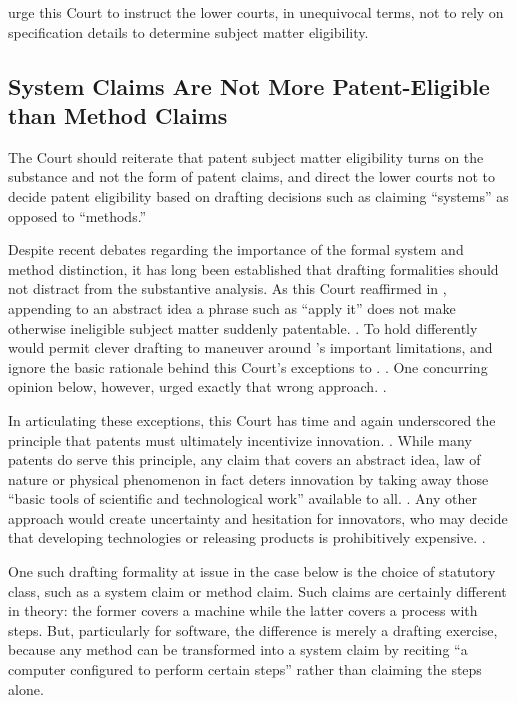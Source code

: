 \documentclass{scotus}
\begin{document}
\Amici urge this Court to instruct the lower courts, in unequivocal
terms, not to rely on specification details to determine subject matter
eligibility.



%
%
\subsection{System Claims Are Not More Patent-Eligible than Method Claims}

The Court should reiterate that patent subject matter eligibility turns on the
substance and not the form of patent claims, and direct
the lower courts not to decide patent eligibility based on drafting
decisions such as claiming “systems” as opposed to “methods.” 

Despite recent debates regarding the importance of the formal system and method
distinction, it has long been established that drafting formalities should not
distract from
the substantive  analysis.  As this Court reaffirmed in
, appending to an abstract idea
a phrase such as “apply it” does
not make otherwise ineligible subject matter suddenly patentable. .  To hold differently would permit clever drafting to maneuver around
's important limitations, and ignore the basic rationale behind this
Court's exceptions to . . One concurring
opinion below, however, urged exactly that wrong approach. .

In articulating these
exceptions, this Court has time and again underscored the principle that patents
must ultimately incentivize innovation. . While many patents do serve this principle, any claim that
covers an abstract idea, law of nature or physical phenomenon in fact deters
innovation by taking away those “basic tools of scientific and technological
work”  available to all. . Any other approach
would create uncertainty and hesitation for innovators, who may decide
that developing technologies or releasing products is prohibitively
expensive. .

One such drafting formality at issue in the case below is the choice of
statutory class, such as a system
claim or method claim.
Such claims are certainly different in theory: the former covers a
machine while the latter covers a process with steps. But, particularly for
software, the difference is merely a drafting exercise, because any method can
be transformed into a system claim by reciting “a computer configured to perform
certain steps” rather than claiming the steps alone. 
\end{document}
